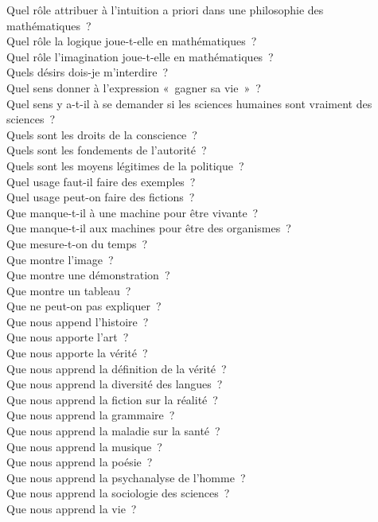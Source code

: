 \documentclass[a4paper,12pt]{article}
\begin{document}
Quel rôle attribuer à l'intuition a priori dans une philosophie des mathématiques ? \\
Quel rôle la logique joue-t-elle en mathématiques ? \\
Quel rôle l'imagination joue-t-elle en mathématiques ? \\
Quels désirs dois-je m'interdire ? \\
Quel sens donner à l'expression « gagner sa vie » ? \\
Quel sens y a-t-il à se demander si les sciences humaines sont vraiment des sciences ? \\
Quels sont les droits de la conscience ? \\
Quels sont les fondements de l'autorité ? \\
Quels sont les moyens légitimes de la politique ? \\
Quel usage faut-il faire des exemples ? \\
Quel usage peut-on faire des fictions ? \\
Que manque-t-il à une machine pour être vivante ? \\
Que manque-t-il aux machines pour être des organismes ? \\
Que mesure-t-on du temps ? \\
Que montre l'image ? \\
Que montre une démonstration ? \\
Que montre un tableau ? \\
Que ne peut-on pas expliquer ? \\
Que nous append l'histoire ? \\
Que nous apporte l'art ? \\
Que nous apporte la vérité ? \\
Que nous apprend la définition de la vérité ? \\
Que nous apprend la diversité des langues ? \\
Que nous apprend la fiction sur la réalité ? \\
Que nous apprend la grammaire ? \\
Que nous apprend la maladie sur la santé ? \\
Que nous apprend la musique ? \\
Que nous apprend la poésie ? \\
Que nous apprend la psychanalyse de l'homme ? \\
Que nous apprend la sociologie des sciences ? \\
Que nous apprend la vie ? \\
\end{document}
